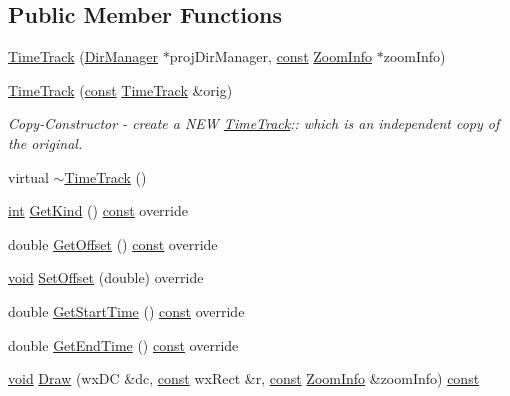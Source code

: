 \subsection*{Public Member Functions}
\begin{DoxyCompactItemize}
\item 
\hyperlink{class_time_track_a655dd0ce74c73522d87cdce387c32eb3}{Time\+Track} (\hyperlink{class_dir_manager}{Dir\+Manager} $\ast$proj\+Dir\+Manager, \hyperlink{getopt1_8c_a2c212835823e3c54a8ab6d95c652660e}{const} \hyperlink{class_zoom_info}{Zoom\+Info} $\ast$zoom\+Info)
\item 
\hyperlink{class_time_track_aff528ebbb4866dc187d75a1813b3f52a}{Time\+Track} (\hyperlink{getopt1_8c_a2c212835823e3c54a8ab6d95c652660e}{const} \hyperlink{class_time_track}{Time\+Track} \&orig)
\begin{DoxyCompactList}\small\item\em Copy-\/\+Constructor -\/ create a N\+EW \hyperlink{class_time_track}{Time\+Track}\+:\+: which is an independent copy of the original. \end{DoxyCompactList}\item 
virtual \hyperlink{class_time_track_aa877a861359abb71c6a6c7ef6394a2e3}{$\sim$\+Time\+Track} ()
\item 
\hyperlink{xmltok_8h_a5a0d4a5641ce434f1d23533f2b2e6653}{int} \hyperlink{class_time_track_a3b78881ca80cdb82380fb029b92a9037}{Get\+Kind} () \hyperlink{getopt1_8c_a2c212835823e3c54a8ab6d95c652660e}{const}  override
\item 
double \hyperlink{class_time_track_a911948a38102b1b2328b68fcce0d6081}{Get\+Offset} () \hyperlink{getopt1_8c_a2c212835823e3c54a8ab6d95c652660e}{const}  override
\item 
\hyperlink{sound_8c_ae35f5844602719cf66324f4de2a658b3}{void} \hyperlink{class_time_track_ae42039b10d79cfb93d9bf115adbf4a15}{Set\+Offset} (double) override
\item 
double \hyperlink{class_time_track_ae8457f6482eadb5fe515f7e1f529799c}{Get\+Start\+Time} () \hyperlink{getopt1_8c_a2c212835823e3c54a8ab6d95c652660e}{const}  override
\item 
double \hyperlink{class_time_track_a9f615c168e1a55877e038a0d4c1a3588}{Get\+End\+Time} () \hyperlink{getopt1_8c_a2c212835823e3c54a8ab6d95c652660e}{const}  override
\item 
\hyperlink{sound_8c_ae35f5844602719cf66324f4de2a658b3}{void} \hyperlink{class_time_track_ac15664abc03b775de3581c9b52aa8f89}{Draw} (wx\+DC \&dc, \hyperlink{getopt1_8c_a2c212835823e3c54a8ab6d95c652660e}{const} wx\+Rect \&r, \hyperlink{getopt1_8c_a2c212835823e3c54a8ab6d95c652660e}{const} \hyperlink{class_zoom_info}{Zoom\+Info} \&zoom\+Info) \hyperlink{getopt1_8c_a2c212835823e3c54a8ab6d95c652660e}{const} 

\end{DoxyCompactItemize}

